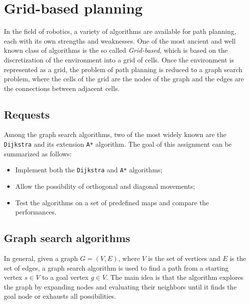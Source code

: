 \section{Grid-based planning}
\label{sec:grid_based_planning}

In the field of robotics, a variety of algorithms are available for path planning, each with its own strengths and weaknesses.
One of the most ancient and well known class of algorithms is the so called \textit{Grid-based}, which is based on the discretization of the environment into a grid of cells.
Once the environment is represented as a grid, the problem of path planning is reduced to a graph search problem, where the cells of the grid are the nodes of the graph and the edges are the connections between adjacent cells.


\subsection{Requests}
\label{sec:requests}

Among the graph search algorithms, two of the most widely known are the \texttt{Dijkstra} and its extension \texttt{A*} algorithm.
The goal of this assignment can be summarized as follows:

\begin{itemize}
    \item Implement both the \texttt{Dijkstra} and \texttt{A*} algorithms;
    \item Allow the possibility of orthogonal and diagonal movements;
    \item Test the algorithms on a set of predefined maps and compare the performances.
\end{itemize}


\subsection{Graph search algorithms}
\label{sec:graph_search_algorithms}

In general, given a graph $G = (V, E)$, where $V$ is the set of vertices and $E$ is the set of edges, a graph search algorithm is used to find a path from a starting vertex $s \in V$ to a goal vertex $g \in V$.
The main idea is that the algorithm explores the graph by expanding nodes and evaluating their neighbors until it finds the goal node or exhausts all possibilities.

